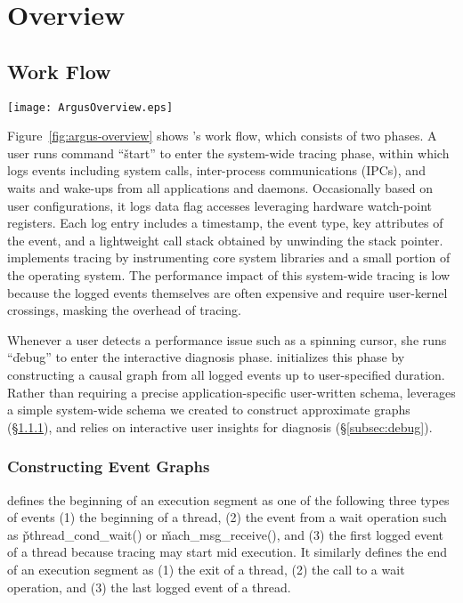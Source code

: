 \section{Overview} \label{sec:overview}

\subsection{\xxx Work Flow}

\begin{figure*}[tb]
    \centering
    \texttt{[image: ArgusOverview.eps]}
    \caption{\xxx Work Flow}
    \label{fig:argus-overview}
\end{figure*}

Figure~\ref{fig:argus-overview} shows \xxx's work flow, which consists of
two phases.  A user runs command ``\v{\xxx start}'' to
enter the system-wide tracing phase, within which \xxx logs events
including system calls, inter-process communications (IPCs), and waits and
wake-ups from all applications and daemons.  Occasionally based on user
configurations, it logs data flag accesses leveraging hardware
watch-point registers.  Each log entry includes a timestamp, the event
type, key attributes of the event, and a lightweight call stack obtained
by unwinding the stack pointer.  \xxx implements tracing by instrumenting
core system libraries and a small portion of the operating system.  The
performance impact of this system-wide tracing is low because the logged
events themselves are often expensive and require user-kernel crossings,
masking the overhead of tracing.

Whenever a user detects a performance issue such as a spinning cursor, she
runs ``\v{\xxx debug}'' to enter the interactive diagnosis phase.  \xxx
initializes this phase by constructing a causal graph from all logged
events up to user-specified duration.  Rather than requiring a precise
application-specific user-written schema, \xxx leverages a simple
system-wide schema we created to construct approximate graphs
(\S\ref{subsec:graph}), and relies on interactive user insights for
diagnosis (\S\ref{subsec:debug}).

\subsubsection{Constructing Event Graphs} \label{subsec:graph}

\xxx defines the beginning of an execution segment as one of the following
three types of events (1) the beginning of a thread, (2) the event from a
wait operation such as \v{pthread\_cond\_wait()} or
\v{mach\_msg\_receive()}, and (3) the first logged event of a thread
because tracing may start mid execution.  It similarly defines the end of
an execution segment as (1) the exit of a thread, (2) the call to a wait
operation, and (3) the last logged event of a thread.


